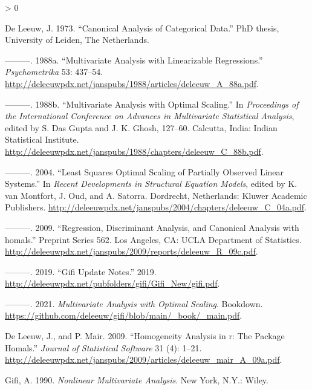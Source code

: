 \documentclass[
  12pt,
]{article}
\newlength{\cslhangindent}
\newenvironment{CSLReferences}[2] %
 {%
  \setlength{\parindent}{0pt}
  \ifodd #1 \everypar{\setlength{\hangindent}{\cslhangindent}}\ignorespaces\fi
  \ifnum #2 > 0
  \setlength{\parskip}{#2\baselineskip}
  \fi
 }%
 {}
\begin{document}
\hypertarget{refs}{}
\begin{CSLReferences}{1}{0}
\leavevmode\hypertarget{ref-deleeuw_B_73}{}%
De Leeuw, J. 1973. {``Canonical Analysis of Categorical Data.''} PhD thesis, University of Leiden, The Netherlands.

\leavevmode\hypertarget{ref-deleeuw_A_88a}{}%
---------. 1988a. {``Multivariate Analysis with Linearizable Regressions.''} \emph{Psychometrika} 53: 437--54. \url{http://deleeuwpdx.net/janspubs/1988/articles/deleeuw_A_88a.pdf}.

\leavevmode\hypertarget{ref-deleeuw_C_88b}{}%
---------. 1988b. {``{Multivariate Analysis with Optimal Scaling}.''} In \emph{Proceedings of the International Conference on Advances in Multivariate Statistical Analysis}, edited by S. Das Gupta and J. K. Ghosh, 127--60. Calcutta, India: Indian Statistical Institute. \url{http://deleeuwpdx.net/janspubs/1988/chapters/deleeuw_C_88b.pdf}.

\leavevmode\hypertarget{ref-deleeuw_C_04a}{}%
---------. 2004. {``Least Squares Optimal Scaling of Partially Observed Linear Systems.''} In \emph{Recent Developments in Structural Equation Models}, edited by K. van Montfort, J. Oud, and A. Satorra. Dordrecht, Netherlands: Kluwer Academic Publishers. \url{http://deleeuwpdx.net/janspubs/2004/chapters/deleeuw_C_04a.pdf}.

\leavevmode\hypertarget{ref-deleeuw_R_09c}{}%
---------. 2009. {``{Regression, Discriminant Analysis, and Canonical Analysis with homals}.''} Preprint Series 562. Los Angeles, CA: UCLA Department of Statistics. \url{http://deleeuwpdx.net/janspubs/2009/reports/deleeuw_R_09c.pdf}.

\leavevmode\hypertarget{ref-deleeuw_E_19i}{}%
---------. 2019. {``{Gifi Update Notes}.''} 2019. \url{http://deleeuwpdx.net/pubfolders/gifi/Gifi_New/gifi.pdf}.

\leavevmode\hypertarget{ref-deleeuw_B_21a}{}%
---------. 2021. \emph{Multivariate Analysis with Optimal Scaling}. Bookdown. \url{https://github.com/deleeuw/gifi/blob/main/_book/_main.pdf}.

\leavevmode\hypertarget{ref-deleeuw_mair_A_09a}{}%
De Leeuw, J., and P. Mair. 2009. {``Homogeneity Analysis in r: The Package Homals.''} \emph{Journal of Statistical Software} 31 (4): 1--21. \url{http://deleeuwpdx.net/janspubs/2009/articles/deleeuw_mair_A_09a.pdf}.

\leavevmode\hypertarget{ref-gifi_B_90}{}%
Gifi, A. 1990. \emph{Nonlinear Multivariate Analysis}. New York, N.Y.: Wiley.


\end{CSLReferences}
\end{document}
